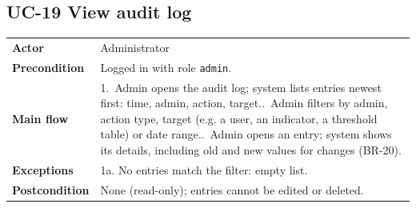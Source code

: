 \documentclass[11pt,a4paper]{article}
\begin{document}
\noindent\begin{minipage}{\linewidth}
\subsection*{UC-19 View audit log}
\begin{tabularx}{\linewidth}{@{}>{\raggedright\leavevmode\bfseries\color{creBlue}}p{2.6cm} Y@{}}
\toprule
Actor & Administrator \\
Precondition & Logged in with role \texttt{admin}. \\
Main flow & 1.~Admin opens the audit log; system lists entries newest first: time, admin, action, target..~Admin filters by admin, action type, target (e.g. a user, an indicator, a threshold table) or date range..~Admin opens an entry; system shows its details, including old and new values for changes (BR-20). \\
Exceptions & 1a. No entries match the filter: empty list. \\
Postcondition & None (read-only); entries cannot be edited or deleted. \\
\bottomrule
\end{tabularx}
\end{minipage}
\par\medskip
\end{document}
